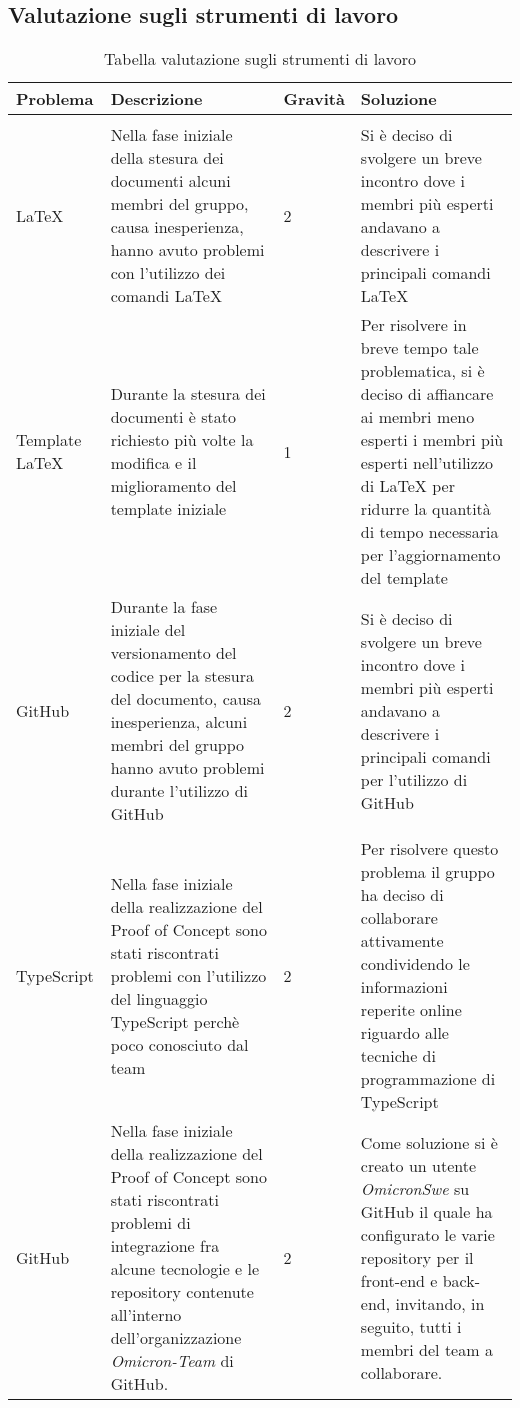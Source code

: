 \subsection{Valutazione sugli strumenti di lavoro}

{

\centering
\renewcommand{\arraystretch}{2}
\begin{longtable}{C{2cm} C{5cm} C{2cm} C{5.2cm}}
\caption{Tabella valutazione sugli strumenti di lavoro}\\
\textbf{Problema} &
\textbf{Descrizione}&
\textbf{Gravità}&
\textbf{Soluzione}\\
\endhead

\\

\LaTeX{} & Nella fase iniziale della stesura dei documenti alcuni membri del gruppo, causa inesperienza, hanno avuto problemi con l'utilizzo dei comandi \LaTeX{} & 2 & Si è deciso di svolgere un breve incontro dove i membri più esperti andavano a descrivere i principali comandi \LaTeX{} \\
Template \LaTeX{} & Durante la stesura dei documenti è stato richiesto più volte la modifica e il miglioramento del template iniziale & 1 & Per risolvere in breve tempo tale problematica, si è deciso di affiancare ai membri meno esperti i membri più esperti nell'utilizzo di \LaTeX{} per ridurre la quantità di tempo necessaria per l'aggiornamento del template \\
GitHub & Durante la fase iniziale del versionamento del codice per la stesura del documento, causa inesperienza, alcuni membri del gruppo hanno avuto problemi durante l'utilizzo di GitHub & 2 & Si è deciso di svolgere un breve incontro dove i membri più esperti andavano a descrivere i principali comandi per l'utilizzo di GitHub\\

\\

TypeScript & Nella fase iniziale della realizzazione del Proof of Concept sono stati riscontrati problemi con l'utilizzo del linguaggio TypeScript perchè poco conosciuto dal team & 2 & Per risolvere questo problema il gruppo ha deciso di collaborare attivamente condividendo le informazioni reperite online riguardo alle tecniche di programmazione di TypeScript\\

GitHub & Nella fase iniziale della realizzazione del Proof of Concept sono stati riscontrati problemi di integrazione fra alcune tecnologie e le repository contenute all'interno dell'organizzazione \textit{Omicron-Team} di GitHub. & 2 & Come soluzione si è creato un utente \textit{OmicronSwe} su GitHub il quale ha configurato le varie repository per il front-end e back-end, invitando, in seguito, tutti i membri del team a collaborare.


\end{longtable}
}